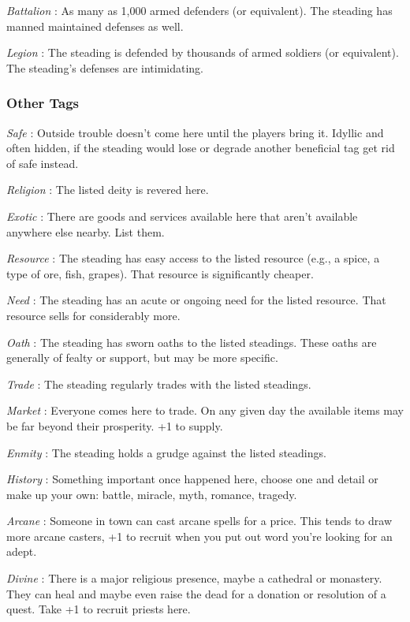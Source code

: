  \emph{Battalion}
: As many as 1,000 armed defenders (or equivalent). The steading has manned maintained defenses as well.


 \emph{Legion}
: The steading is defended by thousands of armed soldiers (or equivalent). The steading's defenses are intimidating.
\subsubsection{Other Tags}


 \emph{Safe}
: Outside trouble doesn't come here until the players bring it. Idyllic and often hidden, if the steading would lose or degrade another beneficial tag get rid of safe instead.


 \emph{Religion}
: The listed deity is revered here.


 \emph{Exotic}
: There are goods and services available here that aren't available anywhere else nearby. List them.


 \emph{Resource}
: The steading has easy access to the listed resource (e.g., a spice, a type of ore, fish, grapes). That resource is significantly cheaper.


 \emph{Need}
: The steading has an acute or ongoing need for the listed resource. That resource sells for considerably more.


 \emph{Oath}
: The steading has sworn oaths to the listed steadings. These oaths are generally of fealty or support, but may be more specific.


 \emph{Trade}
: The steading regularly trades with the listed steadings.


 \emph{Market}
: Everyone comes here to trade. On any given day the available items may be far beyond their prosperity. +1 to supply.


 \emph{Enmity}
: The steading holds a grudge against the listed steadings.


 \emph{History}
: Something important once happened here, choose one and detail or make up your own: battle, miracle, myth, romance, tragedy.


 \emph{Arcane}
: Someone in town can cast arcane spells for a price. This tends to draw more arcane casters, +1 to recruit when you put out word you're looking for an adept.


 \emph{Divine}
: There is a major religious presence, maybe a cathedral or monastery. They can heal and maybe even raise the dead for a donation or resolution of a quest. Take +1 to recruit priests here.


